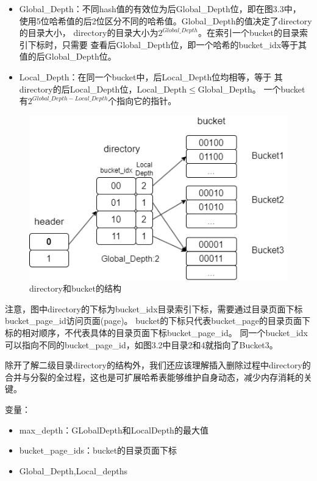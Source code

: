 \documentclass[a4paper]{article}
\begin{document}
\begin{itemize}
   \item Global\_Depth：不同hash值的有效位为后Global\_Depth位，即在图3.3中，
   使用5位哈希值的后2位区分不同的哈希值。Global\_Depth的值决定了directory的目录大小，
   directory的目录大小为$2^{Global\_Depth}$。在索引一个bucket的目录索引下标时，只需要
   查看后Global\_Depth位，即一个哈希的bucket\_idx等于其值的后Global\_Depth位。
   \item Local\_Depth：在同一个bucket中，后Local\_Depth位均相等，等于
   其directory的后Local\_Depth位，Local\_Depth$\leq$Global\_Depth。
   一个bucket有$2^{Global\_Depth-Local\_Depth}$个指向它的指针。
\end{itemize}

\begin{figure}[h!]
   \centering
   \includegraphics[scale=0.6]{3.png}
   \caption{directory和bucket的结构}
   \label{fig:1}
\end{figure}

注意，图中directory的下标为bucket\_idx目录索引下标，需要通过目录页面下标bucket\_page\_id访问页面(page)。
bucket的下标只代表bucket\_page的目录页面下标的相对顺序，不代表具体的目录页面下标bucket\_page\_id。
同一个bucket\_idx可以指向不同的bucket\_page\_id，如图3.2中目录2和4就指向了Bucket3。

除开了解二级目录directory的结构外，我们还应该理解插入删除过程中directory的
合并与分裂的全过程，这也是可扩展哈希表能够维护自身动态，减少内存消耗的关键。

变量：
\begin{itemize}
   \item max\_depth：GLobalDepth和LocalDepth的最大值
   \item bucket\_page\_ids：bucket的目录页面下标
   \item Global\_Depth,Local\_depths
\end{itemize}
\end{document}
